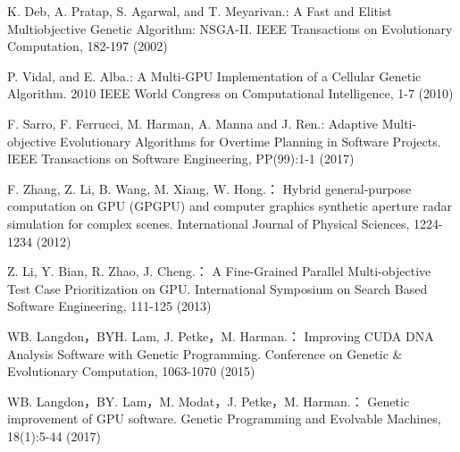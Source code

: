 \begin{thebibliography}{}
K. Deb, A. Pratap, S. Agarwal, and T. Meyarivan.:
A Fast and Elitist Multiobjective Genetic Algorithm: NSGA-II.
IEEE Transactions on Evolutionary Computation, 182-197 (2002)

P. Vidal, and E. Alba.:
A Multi-GPU Implementation of a Cellular Genetic Algorithm.
2010 IEEE World Congress on Computational Intelligence, 1-7 (2010)

F. Sarro, F. Ferrucci, M. Harman, A. Manna and J. Ren.:
Adaptive Multi-objective Evolutionary Algorithms for Overtime Planning in Software Projects.
IEEE Transactions on Software Engineering, PP(99):1-1 (2017)

F. Zhang, Z. Li, B. Wang, M. Xiang, W. Hong.：
Hybrid general-purpose computation on GPU (GPGPU) and computer graphics synthetic aperture radar simulation for complex scenes.
International Journal of Physical Sciences, 1224-1234 (2012)

Z. Li, Y. Bian, R. Zhao, J. Cheng.：
A Fine-Grained Parallel Multi-objective Test Case Prioritization on GPU.
International Symposium on Search Based Software Engineering, 111-125 (2013)

WB. Langdon，BYH. Lam, J. Petke，M. Harman.：
Improving CUDA DNA Analysis Software with Genetic Programming.
Conference on Genetic & Evolutionary Computation, 1063-1070 (2015)

WB. Langdon，BY. Lam，M. Modat，J. Petke，M. Harman.：
Genetic improvement of GPU software.
Genetic Programming and Evolvable Machines, 18(1):5-44 (2017)











\end{thebibliography}
\clearpage

